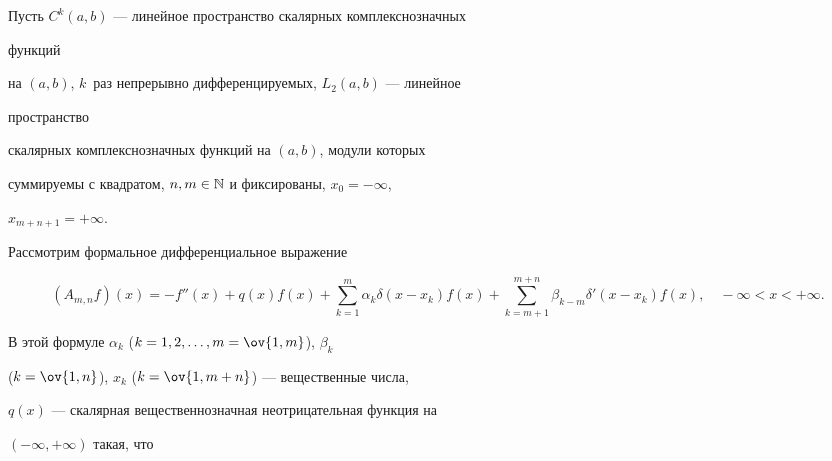  


\date{} 




 


\pagestyle{plain} %


 


 




 


\maketitle 


\label{begin} 


 


Пусть $C^k(a,b)$ --- линейное пространство скалярных комплекснозначных 


функций 


на $(a,b)$, $k$~раз непрерывно дифференцируемых, $L_2(a,b)$ --- линейное 


пространство 


скалярных комплекснозначных функций на $(a,b)$, модули которых 


суммируемы с квадратом, $n,m\in\Bbb N$ и фиксированы, $x_0=-\infty$, 


$x_{m+n+1}=+\infty$. 


 


Рассмотрим формальное дифференциальное выражение 


$$ 


(A_{m,n}f)(x)=-f''(x)+q(x)f(x)+ 


\sum^m_{k=1}\alpha_k\delta(x-x_k)f(x)+ 


\sum^{m+n}_{k=m+1}\beta_{k-m}\delta'(x-x_k)f(x),\quad 


-\infty<x<+\infty. 


$$ 


В этой формуле $\alpha_k$ ($k=1,2,\dotsc,m=\ov{1,m}$), $\beta_k$ 


($k=\ov{1,n}$), $x_k$ ($k=\ov{1,m+n}$) --- вещественные числа,


$q(x)$ --- скалярная вещественнозначная неотрицательная функция на 


$(-\infty,+\infty)$ такая, что 


